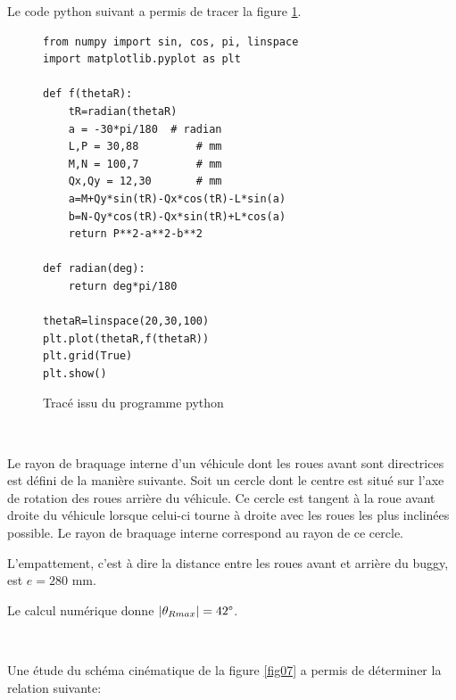 Le code python suivant a permis de tracer la figure \ref{fig07b}.
\begin{figure}[!ht]
\begin{minipage}{0.5\linewidth}
\begin{verbatim}
from numpy import sin, cos, pi, linspace
import matplotlib.pyplot as plt

def f(thetaR):
    tR=radian(thetaR)
    a = -30*pi/180  # radian
    L,P = 30,88         # mm
    M,N = 100,7         # mm
    Qx,Qy = 12,30       # mm
    a=M+Qy*sin(tR)-Qx*cos(tR)-L*sin(a)
    b=N-Qy*cos(tR)-Qx*sin(tR)+L*cos(a)
    return P**2-a**2-b**2
    		
def radian(deg):
    return deg*pi/180

thetaR=linspace(20,30,100)
plt.plot(thetaR,f(thetaR))
plt.grid(True)
plt.show()
\end{verbatim}
\end{minipage}
\hfill
\begin{minipage}{0.5\linewidth}
   \def\svgwidth{\textwidth}
 \centering
 \caption{\label{fig07b}Tracé issu du programme python}
\end{minipage}
\end{figure}


~\

Le rayon de braquage interne d'un véhicule dont les roues avant sont directrices est défini de la manière suivante. Soit un cercle dont le centre est situé sur l'axe de rotation des roues arrière du véhicule. Ce cercle est tangent à la roue avant droite du véhicule lorsque celui-ci tourne à droite avec les roues les plus inclinées possible. Le rayon de braquage interne correspond au rayon de ce cercle.

L'empattement, c'est à dire la distance entre les roues avant et arrière du buggy, est $e = 280$ mm.

Le calcul numérique donne $|\theta_{Rmax}| = 42\degree$.


~\

Une étude du schéma cinématique de la figure \ref{fig07} a permis de déterminer la relation suivante:

